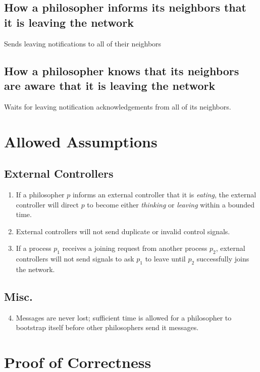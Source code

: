\documentclass[11pt]{article}
\begin{document}
\subsection{How a philosopher informs its neighbors that it is leaving the network}
Sends leaving notifications to all of their neighbors

\subsection{How a philosopher knows that its neighbors are aware that it is leaving the network}
Waits for leaving notification acknowledgements from all of its neighbors.

\section{Allowed Assumptions}

\subsection{External Controllers}
\begin{enumerate}[E1]
\item If a philosopher $p$ informs an external controller that it is \emph{eating}, the external controller will direct $p$ to become either \emph{thinking} or \emph{leaving} within a bounded time.

\item External controllers will not send duplicate or invalid control signals.

\item \label{Assump:E_guarantees_nodes_entering_network} If a process $p_1$ receives a joining request from another process $p_2$, external controllers will not send signals to ask $p_1$ to leave until $p_2$ successfully joins the network.
\end{enumerate}

\subsection{Misc.}
\begin{enumerate}[E1]
\setcounter{enumi}{3}
\item \label{Assump:message_never_lost} Messages are never lost; sufficient time is allowed for a philosopher to bootstrap itself before other philosophers send it messages.
\end{enumerate}


\section{Proof of Correctness}
\end{document}
